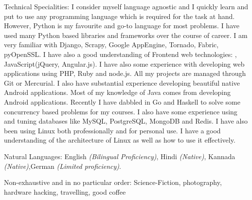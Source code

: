 \documentclass[10pt,a4paper]{article}
\begin{document}
{
}

{
}


\spacedhrule{0.5em}{-0.4em}


\inlineheadsection  %
  {Technical Specialities:}
  {I consider myself language agnostic and I quickly learn and put to use any programming language which is required for the task at hand. However, Python is my favourite and go-to language for most problems. I have used many Python based libraries and frameworks over the course of career. I am very familiar with Django, Scrapy, Google AppEngine, Tornado, Fabric, pyOpenSSL. I have also a good understanding of Frontend web technologies: , JavaScript(jQuery, Angular.js). I have also some experience with developing web applications using PHP, Ruby and node.js. All my projects are managed through Git or Mercurial. I also have substantial experience developing beautiful native Android applications. Most of my knowledge of Java comes from developing Android applications. Recently I have dabbled in Go and Haskell to solve some concurrency based problems for my courses. I also have some experience using and tuning databases like MySQL, PostgreSQL, MongoDB and Redis. I have also been using Linux both professionally and for personal use. I have a good understanding of the architecture of Linux as well as how to use it effectively.
}

\inlineheadsection
  {Natural Languages:}
  {English \emph{(Bilingual Proficiency)}, Hindi \emph{(Native)}, Kannada \emph{(Native)},German \emph{(Limited proficiency)}.}


\spacedhrule{1.6em}{-0.4em}


\inlineheadsection
  {Non-exhaustive and in no particular order:}
  {Science-Fiction, photography, hardware hacking, travelling, good coffee}
\end{document}
